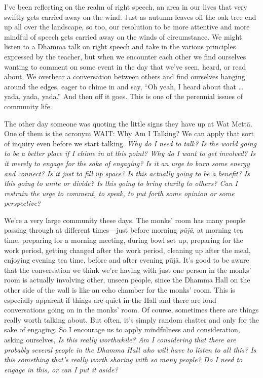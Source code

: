 
I've been reflecting on the realm of right speech, an area in our lives 
that very swiftly gets carried away on the wind. Just as autumn leaves 
off the oak tree end up all over the landscape, so too, our resolution 
to be more attentive and more mindful of speech gets carried away on 
the winds of circumstance. We might listen to a Dhamma talk on right 
speech and take in the various principles expressed by the teacher, but 
when we encounter each other we find ourselves wanting to comment on 
some event in the day that we've seen, heard, or read about. We 
overhear a conversation between others and find ourselves hanging 
around the edges, eager to chime in and say, ``Oh yeah, I heard about 
that … yada, yada, yada.'' And then off it goes. This is one of the 
perennial issues of community life.

The other day someone was quoting the little signs they have up at Wat 
Mettā. One of them is the acronym WAIT: Why Am I Talking? We can apply 
that sort of inquiry even before we start talking. \emph{Why do I need 
to talk? Is the world going to be a better place if I chime in at this 
point? Why do I want to get involved? Is it merely to engage for the 
sake of engaging? Is it an urge to burn some energy and connect? Is it 
just to fill up space? Is this actually going to be a benefit? Is this 
going to unite or divide? Is this going to bring clarity to others? Can 
I restrain the urge to comment, to speak, to put forth some opinion or 
some perspective?}

We're a very large community these days. The monks' room has many 
people passing through at different times---just before morning 
\emph{pūjā}, at morning tea time, preparing for a morning meeting, 
during bowl set up, preparing for the work period, getting changed 
after the work period, cleaning up after the meal, enjoying evening tea 
time, before and after evening pūjā. It's good to be aware that the 
conversation we think we're having with just one person in the monks' 
room is actually involving other, unseen people, since the Dhamma Hall 
on the other side of the wall is like an echo chamber for the monks' 
room. This is especially apparent if things are quiet in the Hall and 
there are loud conversations going on in the monks' room. Of course, 
sometimes there are things really worth talking about. But often, it's 
simply random chatter and only for the sake of engaging. So I encourage 
us to apply mindfulness and consideration, asking ourselves, \emph{Is 
this really worthwhile? Am I considering that there are probably 
several people in the Dhamma Hall who will have to listen to all this? 
Is this something that's really worth sharing with so many people? Do I 
need to engage in this, or can I put it aside?}

